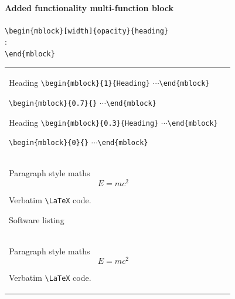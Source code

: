 \documentclass[10pt,aspectratio=43]{beamer}
\begin{document}
\begin{frame}[fragile]

\framesubtitle{Added functionality multi-function block}

\vspace*{-3ex}
\color{black}
\footnotesize
\verb|\begin{mblock}[width]{opacity}{heading}|\\
\hspace*{2em}:\\[1ex]
\verb|\end{mblock}|\\
\tiny
\begin{tabular}{p{}@{\hspace*{0.5cm}}p{}}

\begin{mblock}{1}{Heading}
\verb|\begin{mblock}{1}{Heading}|
$\cdots$\verb|\end{mblock}|
\end{mblock}

\begin{mblock}{0.7}{}
\verb|\begin{mblock}{0.7}{}|
$\cdots$\verb|\end{mblock}|
\end{mblock}

\begin{mblock}{0.3}{Heading}
\verb|\begin{mblock}{0.3}{Heading}|
$\cdots$\verb|\end{mblock}|
\end{mblock}

\begin{mblock}{0}{}
\verb|\begin{mblock}{0}{}|
$\cdots$\verb|\end{mblock}|
\end{mblock}

& 

\begin{mblock}{1}{Mass--energy equivalence}{
Use the \textsl{mblock} environment for:
\begin{itemize}
\item Inline maths: $E = mc^2$\\
\item Paragraph style maths \[E = mc^2\]
\item Verbatim \verb|\LaTeX| code.
\item Software listing
\begin{verbatim}
\begin{itemize}
\item Inline maths: $E = mc^2$\\
\item Paragraph style maths \[E = mc^2\]
\item Verbatim \verb|\LaTeX| code.
\end{itemize}
\end{verbatim}
\end{itemize}
}
\end{mblock}
\end{tabular}
\end{frame}
\end{document}
